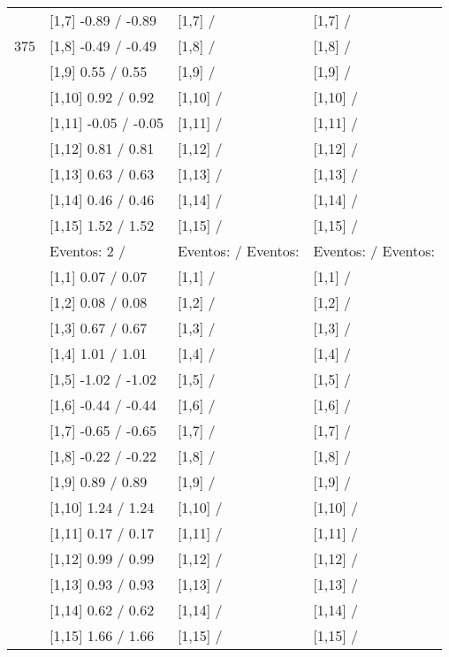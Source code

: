 \begin{table}
\begin{tabular}[t]{llll}
 & {}[1,7] -0.89  / -0.89 & {}[1,7]  / & {}[1,7]  /\\
375 & {}[1,8] -0.49  / -0.49 & {}[1,8]  / & {}[1,8]  /\\
\addlinespace
 & {}[1,9] 0.55  / 0.55 & {}[1,9]  / & {}[1,9]  /\\
 & {}[1,10] 0.92  / 0.92 & {}[1,10]  / & {}[1,10]  /\\
 & {}[1,11] -0.05  / -0.05 & {}[1,11]  / & {}[1,11]  /\\
 & {}[1,12] 0.81  / 0.81 & {}[1,12]  / & {}[1,12]  /\\
 & {}[1,13] 0.63  / 0.63 & {}[1,13]  / & {}[1,13]  /\\
\addlinespace
 & {}[1,14] 0.46  / 0.46 & {}[1,14]  / & {}[1,14]  /\\
 & {}[1,15] 1.52  / 1.52 & {}[1,15]  / & {}[1,15]  /\\
 & Eventos:  2 / & Eventos:   / Eventos: & Eventos:   / Eventos:\\
 & {}[1,1] 0.07  / 0.07 & {}[1,1]  / & {}[1,1]  /\\
 & {}[1,2] 0.08  / 0.08 & {}[1,2]  / & {}[1,2]  /\\
\addlinespace
 & {}[1,3] 0.67  / 0.67 & {}[1,3]  / & {}[1,3]  /\\
 & {}[1,4] 1.01  / 1.01 & {}[1,4]  / & {}[1,4]  /\\
 & {}[1,5] -1.02  / -1.02 & {}[1,5]  / & {}[1,5]  /\\
 & {}[1,6] -0.44  / -0.44 & {}[1,6]  / & {}[1,6]  /\\
 & {}[1,7] -0.65  / -0.65 & {}[1,7]  / & {}[1,7]  /\\
\addlinespace
500 & {}[1,8] -0.22  / -0.22 & {}[1,8]  / & {}[1,8]  /\\
 & {}[1,9] 0.89  / 0.89 & {}[1,9]  / & {}[1,9]  /\\
 & {}[1,10] 1.24  / 1.24 & {}[1,10]  / & {}[1,10]  /\\
 & {}[1,11] 0.17  / 0.17 & {}[1,11]  / & {}[1,11]  /\\
 & {}[1,12] 0.99  / 0.99 & {}[1,12]  / & {}[1,12]  /\\
\addlinespace
 & {}[1,13] 0.93  / 0.93 & {}[1,13]  / & {}[1,13]  /\\
 & {}[1,14] 0.62  / 0.62 & {}[1,14]  / & {}[1,14]  /\\
 & {}[1,15] 1.66  / 1.66 & {}[1,15]  / & {}[1,15]  /\\
\bottomrule
\end{tabular}
\end{table}
